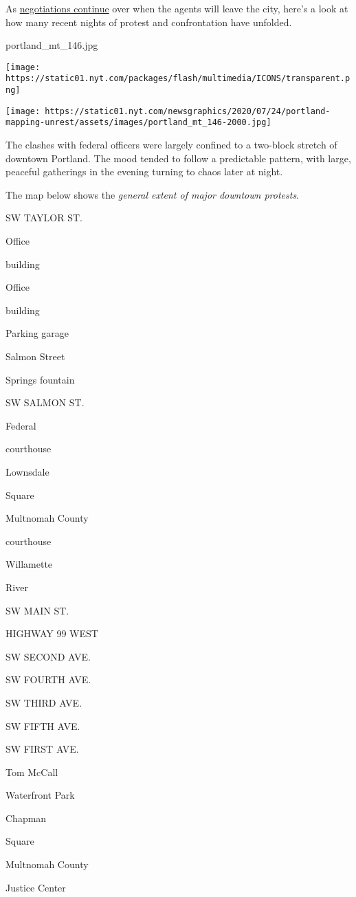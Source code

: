 As
\href{https://www.nytimes.com/2020/07/29/us/protests-portland-federal-withdrawal.html}{negotiations
continue} over when the agents will leave the city, here's a look at how
many recent nights of protest and confrontation have unfolded.

portland\_mt\_146.jpg

\texttt{[image: https://static01.nyt.com/packages/flash/multimedia/ICONS/transparent.png]}

\texttt{[image: https://static01.nyt.com/newsgraphics/2020/07/24/portland-mapping-unrest/assets/images/portland\_mt\_146-2000.jpg]}

The clashes with federal officers were largely confined to a two-block
stretch of downtown Portland. The mood tended to follow a predictable
pattern, with large, peaceful gatherings in the evening turning to chaos
later at night.

The map below shows the \emph{general extent of major downtown
protests}.

SW TAYLOR ST.

Office

building

Office

building

Parking garage

Salmon Street

Springs fountain

SW SALMON ST.

Federal

courthouse

Lownsdale

Square

Multnomah County

courthouse

Willamette

River

SW MAIN ST.

HIGHWAY 99 WEST

SW SECOND AVE.

SW FOURTH AVE.

SW THIRD AVE.

SW FIFTH AVE.

SW FIRST AVE.

Tom McCall

Waterfront Park

Chapman

Square

Multnomah County

Justice Center

